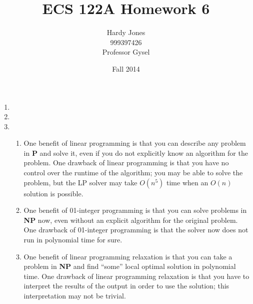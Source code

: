 \documentclass[12pt,letterpaper]{article}
\title{ECS 122A Homework 6\vspace{-2ex}}
\author{Hardy Jones\\
        999397426\\
        Professor Gysel\vspace{-2ex}}
\date{Fall 2014}
\begin{document}
  \maketitle

  \begin{enumerate}
    \item
    \item
    \item
      \begin{enumerate}
        \item
          One benefit of linear programming is that
          you can describe any problem in \textbf{P} and solve it,
          even if you do not explicitly know an algorithm for the problem.
          One drawback of linear programming is that
          you have no control over the runtime of the algorithm;
          you may be able to solve the problem,
          but the LP solver may take $O(n^5)$ time when an $O(n)$ solution is possible.
        \item
          One benefit of 01-integer programming is that
          you can solve problems in \textbf{NP} now,
          even without an explicit algorithm for the original problem.
          One drawback of 01-integer programming is that
          the solver now does not run in polynomial time for sure.
        \item
          One benefit of linear programming relaxation is that
          you can take a problem in \textbf{NP} and
          find ``some'' local optimal solution in polynomial time.
          One drawback of linear programming relaxation is that
          you have to interpret the results of the output in order to use the solution;
          this interpretation may not be trivial.
      \end{enumerate}
  \end{enumerate}
\end{document}
